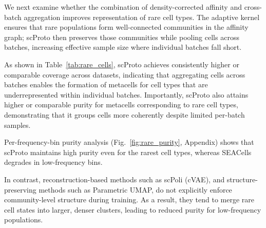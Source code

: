 We next examine whether the combination of density-corrected affinity and cross-batch aggregation improves representation of rare cell types.
The adaptive kernel ensures that rare populations form well-connected communities in the affinity graph; scProto then preserves those communities while pooling cells across batches, increasing effective sample size where individual batches fall short.

As shown in Table~\ref{tab:rare_cells}, scProto achieves consistently higher or comparable coverage across datasets, indicating that aggregating cells across batches enables the formation of metacells for cell types that are underrepresented within individual batches. Importantly, scProto also attains higher or comparable purity for metacells corresponding to rare cell types, demonstrating that it groups cells more coherently despite limited per-batch samples.

Per-frequency-bin purity analysis (Fig.~\ref{fig:rare_purity}, Appendix) shows that scProto maintains high purity even for the rarest cell types, whereas SEACells degrades in low-frequency bins.

In contrast, reconstruction-based methods such as scPoli (cVAE), and structure-preserving methods such as Parametric UMAP, do not explicitly enforce community-level structure during training. As a result, they tend to merge rare cell states into larger, denser clusters, leading to reduced purity for low-frequency populations.


